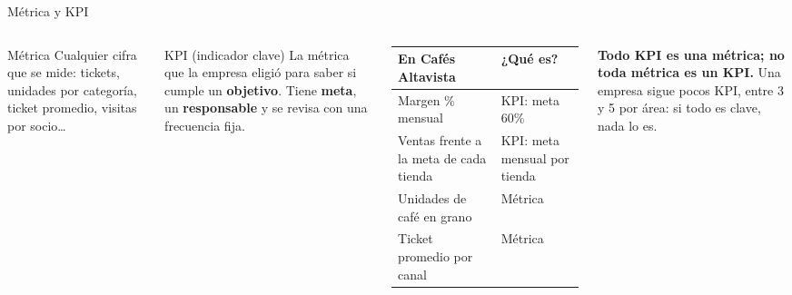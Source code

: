 \documentclass[aspectratio=169,11pt]{beamer}
\begin{document}
\begin{frame}[t]{Métrica y KPI}
  \begin{columns}[T,onlytextwidth]
    \begin{block}{Métrica}
      \small Cualquier cifra que se mide: tickets, unidades por categoría,
      ticket promedio, visitas por socio\ldots
    \end{block}
    \begin{exampleblock}{KPI (indicador clave)}
      \small La métrica que la empresa eligió para saber si cumple un
      \textbf{objetivo}. Tiene \textbf{meta}, un \textbf{responsable} y se
      revisa con una frecuencia fija.
    \end{exampleblock}
    \footnotesize
    \renewcommand{\arraystretch}{1.25}
    \begin{tabular}{@{}L{2.8cm}L{3.4cm}@{}}
      \toprule
      \textbf{En Cafés Altavista} & \textbf{¿Qué es?} \\
      \midrule
      Margen \% mensual & KPI: meta 60\% \\
      Ventas frente a la meta de cada tienda & KPI: meta mensual por tienda \\
      Unidades de café en grano & Métrica \\
      Ticket promedio por canal & Métrica \\
      \bottomrule
    \end{tabular}
    \vspace{0.15cm}

    \footnotesize\textbf{Todo KPI es una métrica; no toda métrica es un
    KPI.} Una empresa sigue pocos KPI, entre 3 y 5 por área: si todo es
    clave, nada lo es.
  \end{columns}
\end{frame}
\end{document}
